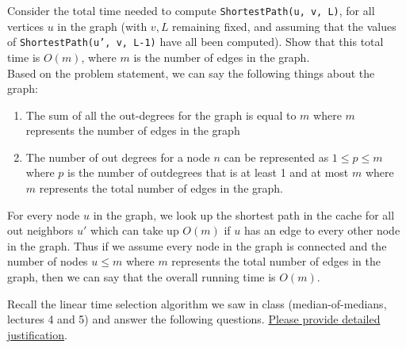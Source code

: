\documentclass[addpoints]{exam}
\begin{document}
\begin{questions}
\begin{parts}
    Consider the total time needed to compute \texttt{ShortestPath(u, v, L)}, for all vertices $u$ in the graph (with $v, L$ remaining fixed, and assuming that the values of \texttt{ShortestPath(u', v, L-1)} have all been computed). Show that this total time is $O(m)$, where $m$ is the number of edges in the graph. \\
    Based on the problem statement, we can say the following things about the graph:
    \begin{enumerate}
      \item The sum of all the out-degrees for the graph is equal to $m$ where $m$ represents the number of edges in the graph
      \item The number of out degrees for a node $n$ can be represented as $1 \leq p \leq m$ where $p$ is the number of outdegrees that is at least 1 and at most $m$ where $m$ represents the total number of edges in the graph.
    \end{enumerate}
    For every node $u$ in the graph, we look up the shortest path in the cache for all out neighbors $u'$ which can take up $O(m)$ if $u$ has
    an edge to every other node in the graph. Thus if we assume every node in the graph is connected and the number of nodes $u \leq m$ where $m$ represents the total number of edges in the graph,
    then we can say that the overall running time is $O(m)$.

  \end{parts}

  Recall the linear time selection algorithm we saw in class (median-of-medians, lectures 4 and 5) and answer the following questions. {\underline{Please provide detailed justification}}.
  \begin{parts}

\end{parts}
\end{questions}
\end{document}
